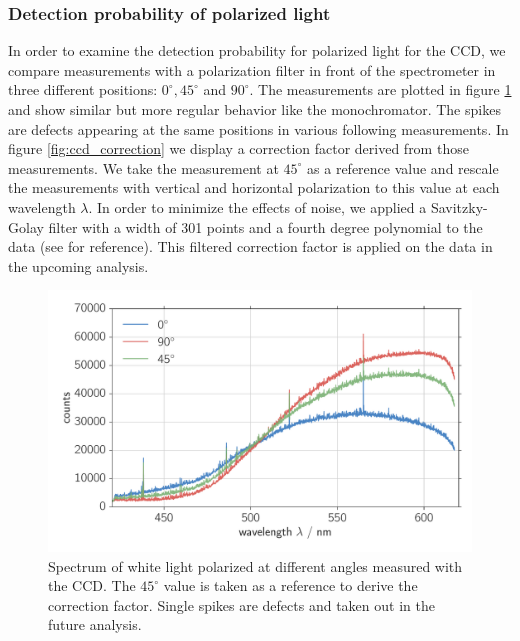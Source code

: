 \subsubsection{Detection probability of polarized light}
In order to examine the detection probability for polarized light for the CCD, we compare measurements with 
a polarization filter in front of the spectrometer in three different positions: $0^\circ, 45^\circ$ and 
$90^\circ$. The measurements are plotted in figure \ref{fig:ccd_polarized} and show similar but more regular 
behavior like the monochromator. The spikes are defects appearing at the same positions in various following 
measurements. In figure \ref{fig:ccd_correction} we display a correction factor derived from those 
measurements. We take the measurement at $45^\circ$ as a reference value and rescale the measurements with
vertical and horizontal polarization to this value at each wavelength $\lambda$. In order to minimize the 
effects of noise, we applied a Savitzky-Golay filter with a width of 301 points and a fourth degree polynomial
to the data (see \cite{scipy} for reference). This filtered correction factor is applied on the data in the 
upcoming analysis. 

\begin{figure}[htpb]
    \centering
    \includegraphics[width=0.8\linewidth]{analysis/figures/ccd_polarized}
    \caption{Spectrum of white light polarized at different angles measured with the CCD. The $45^\circ$ value
    is taken as a reference to derive the correction factor. Single spikes are defects and taken out in the 
    future analysis.}
    \label{fig:ccd_polarized}
\end{figure}


